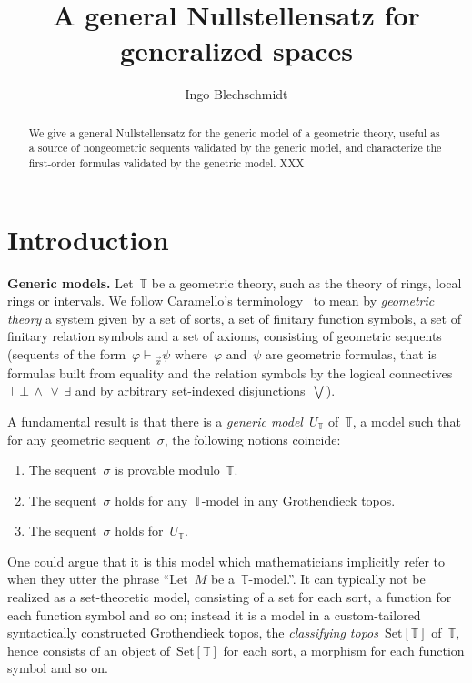 \documentclass[oneside,reqno]{amsart}
\title{A general Nullstellensatz for generalized spaces}
\author{Ingo Blechschmidt}
\theoremstyle{definition}
\theoremstyle{plain}
\theoremstyle{remark}
\newcommand{\TT}{\mathbb{T}}
\newcommand{\Set}{\mathrm{Set}}
\renewcommand{\_}{\mathpunct{.}\,}
\newcommand{\?}{\,{:}\,}
\renewcommand{\paragraph}[1]{\noindent\textbf{#1.}}
\newcommand{\seq}[1]{\mathrel{\vdash\!\!\!_{#1}}}
\begin{document}
\begin{abstract}
  We give a general Nullstellensatz for the generic model of a
  geometric theory, useful as a source of nongeometric sequents validated by
  the generic model, and characterize the first-order formulas validated by the
  genetric model. XXX
\end{abstract}

\maketitle
\thispagestyle{empty}

\section{Introduction}

\paragraph{Generic models} Let~$\TT$ be a geometric theory, such as the theory
of rings, local rings or intervals. We follow Caramello's
terminology~\cite{caramello:tst} to mean by \emph{geometric theory} a system
given by a set of sorts, a set of finitary function symbols, a set of finitary
relation symbols and a set of axioms, consisting of geometric sequents
(sequents of the form~$\varphi \seq{\vec x} \psi$ where~$\varphi$ and~$\psi$
are geometric formulas, that is formulas built from equality and the relation
symbols by the logical connectives~${\top}\,{\bot}\,{\wedge}\,{\vee}\,{\exists}$
and by arbitrary set-indexed disjunctions~$\bigvee$).

A fundamental result is that there is a \emph{generic model}~$U_\TT$ of~$\TT$,
a model such that for any geometric sequent~$\sigma$, the following notions
coincide:
\begin{enumerate}
\item The sequent~$\sigma$ is provable modulo~$\TT$.
\item The sequent~$\sigma$ holds for any~$\TT$-model in any Grothendieck topos.
\item The sequent~$\sigma$ holds for~$U_\TT$.
\end{enumerate}
One could argue that it is this model which mathematicians
implicitly refer to when they utter the phrase ``Let~$M$ be a~$\TT$-model.''. It can
typically not be realized as a set-theoretic model, consisting of a set for
each sort, a function for each function symbol and so on; instead it is a model
in a custom-tailored syntactically constructed Grothendieck topos, the
\emph{classifying topos}~$\Set[\TT]$ of~$\TT$, hence consists of an object
of~$\Set[\TT]$ for each sort, a morphism for each function symbol and so on.
\end{document}
